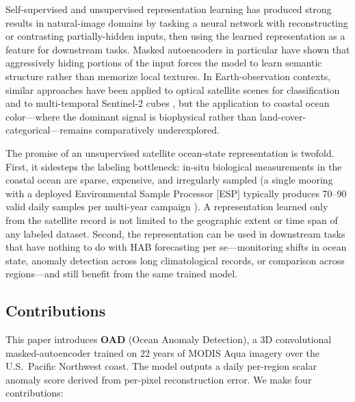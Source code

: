 \documentclass[toxins,article,submit,moreauthors]{Definitions/mdpi}
\begin{document}
Self-supervised and unsupervised representation learning has produced strong results in natural-image domains by tasking a neural network with reconstructing or contrasting partially-hidden inputs, then using the learned representation as a feature for downstream tasks. Masked autoencoders \cite{He2022MAE} in particular have shown that aggressively hiding portions of the input forces the model to learn semantic structure rather than memorize local textures. In Earth-observation contexts, similar approaches have been applied to optical satellite scenes for classification \cite{Cong2022SatMAE} and to multi-temporal Sentinel-2 cubes \cite{Wang2023MAE}, but the application to coastal ocean color---where the dominant signal is biophysical rather than land-cover-categorical---remains comparatively underexplored.

The promise of an unsupervised satellite ocean-state representation is twofold. First, it sidesteps the labeling bottleneck: in-situ biological measurements in the coastal ocean are sparse, expensive, and irregularly sampled (a single mooring with a deployed Environmental Sample Processor [ESP] typically produces 70--90 valid daily samples per multi-year campaign \cite{Moore2021ESP}). A representation learned only from the satellite record is not limited to the geographic extent or time span of any labeled dataset. Second, the representation can be used in downstream tasks that have nothing to do with HAB forecasting per se---monitoring shifts in ocean state, anomaly detection across long climatological records, or comparison across regions---and still benefit from the same trained model.

\subsection{Contributions}

This paper introduces \textbf{OAD} (Ocean Anomaly Detection), a 3D convolutional masked-autoencoder trained on 22 years of MODIS Aqua imagery over the U.S.\ Pacific Northwest coast. The model outputs a daily per-region scalar anomaly score derived from per-pixel reconstruction error. We make four contributions:
\end{document}
